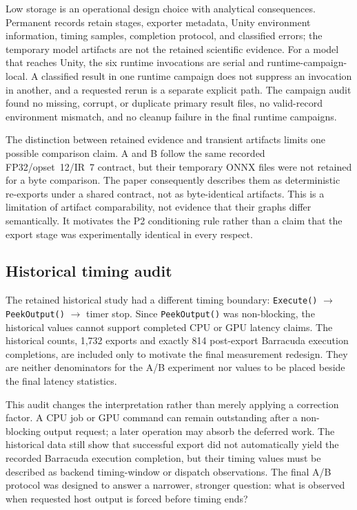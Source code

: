 Low storage is an operational design choice with analytical consequences. Permanent records retain stages, exporter metadata, Unity environment information, timing samples, completion protocol, and classified errors; the temporary model artifacts are not the retained scientific evidence. For a model that reaches Unity, the six runtime invocations are serial and runtime-campaign-local. A classified result in one runtime campaign does not suppress an invocation in another, and a requested rerun is a separate explicit path. The campaign audit found no missing, corrupt, or duplicate primary result files, no valid-record environment mismatch, and no cleanup failure in the final runtime campaigns.

The distinction between retained evidence and transient artifacts limits one possible comparison claim. A and B follow the same recorded FP32/opset~12/IR~7 contract, but their temporary ONNX files were not retained for a byte comparison. The paper consequently describes them as deterministic re-exports under a shared contract, not as byte-identical artifacts. This is a limitation of artifact comparability, not evidence that their graphs differ semantically. It motivates the P2 conditioning rule rather than a claim that the export stage was experimentally identical in every respect.

\subsection{Historical timing audit}
The retained historical study had a different timing boundary: \texttt{Execute()} $\rightarrow$ \texttt{PeekOutput()} $\rightarrow$ timer stop. Since \texttt{PeekOutput()} was non-blocking, the historical values cannot support completed CPU or GPU latency claims. The historical counts, 1,732 exports and exactly 814 post-export Barracuda execution completions, are included only to motivate the final measurement redesign. They are neither denominators for the A/B experiment nor values to be placed beside the final latency statistics.

This audit changes the interpretation rather than merely applying a correction factor. A CPU job or GPU command can remain outstanding after a non-blocking output request; a later operation may absorb the deferred work. The historical data still show that successful export did not automatically yield the recorded Barracuda execution completion, but their timing values must be described as backend timing-window or dispatch observations. The final A/B protocol was designed to answer a narrower, stronger question: what is observed when requested host output is forced before timing ends?

